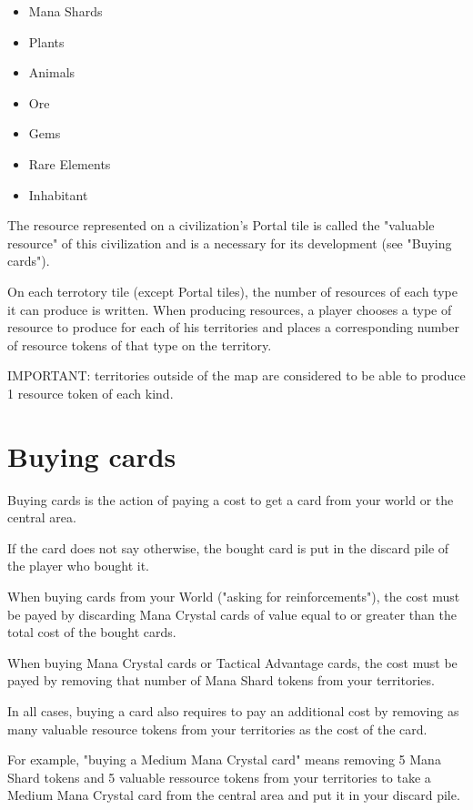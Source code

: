 \documentclass[a4paper]{article}
\begin{document}
    \begin{itemize}
        \item Mana Shards
        \item Plants
        \item Animals
        \item Ore
        \item Gems
        \item Rare Elements
        \item Inhabitant
    \end{itemize}

    The resource represented on a civilization's Portal tile is called the "valuable resource" of this civilization and is a necessary for its development (see "Buying cards").

    On each terrotory tile (except Portal tiles), the number of resources of each type it can produce is written.
    When producing resources, a player chooses a type of resource to produce for each of his territories and places a corresponding number of resource tokens of that type on the territory.

    IMPORTANT: territories outside of the map are considered to be able to produce 1 resource token of each kind.



\section{Buying cards}

    Buying cards is the action of paying a cost to get a card from your world or the central area.

    If the card does not say otherwise, the bought card is put in the discard pile of the player who bought it.

    When buying cards from your World ("asking for reinforcements"),
    the cost must be payed by discarding Mana Crystal cards of value equal to or greater
    than the total cost of the bought cards.

    When buying Mana Crystal cards or Tactical Advantage cards,
    the cost must be payed by removing that number of Mana Shard tokens from your territories.

    In all cases, buying a card also requires to pay an additional cost by removing as
    many valuable resource tokens from your territories as the cost of the card.

    For example, "buying a Medium Mana Crystal card" means removing 5 Mana Shard tokens and 5 valuable ressource
    tokens from your territories to take a Medium Mana Crystal card from the central area and put it in your discard pile.
\end{document}
